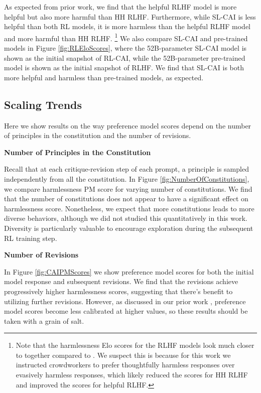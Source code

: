As expected from prior work, we find that the helpful RLHF model is more helpful but also more harmful than HH RLHF.  Furthermore, while SL-CAI is less helpful than both RL models, it is more harmless than the helpful RLHF model and more harmful than HH RLHF. \footnote{Note that the harmlessness Elo scores for the RLHF models look much closer to together compared to \cite{bai2022training}. We suspect this is because for this work we instructed crowdworkers to prefer thoughtfully harmless responses over evasively harmless responses, which likely reduced the scores for HH RLHF and improved the scores for helpful RLHF.} We also compare SL-CAI and pre-trained models in Figure \ref{fig:RLEloScores}, where the 52B-parameter SL-CAI model is shown as the initial snapshot of RL-CAI, while the 52B-parameter pre-trained model is shown as the initial snapshot of RLHF. We find that SL-CAI is both more helpful and harmless than pre-trained models, as expected.

\subsection{Scaling Trends}

Here we show results on the way preference model scores depend on the number of principles in the constitution and the number of revisions.

{\bf Number of Principles in the Constitution}

Recall that at each critique-revision step of each prompt, a  principle is sampled independently from all  the constitution.  In Figure \ref{fig:NumberOfConstitutions}, we compare harmlessness PM score for varying number of constitutions. We find that the number of constitutions does not appear to have a significant effect on harmlessness score. Nonetheless, we expect that more constitutions leads to more diverse behaviors, although we did not studied this quantitatively in this work.  Diversity is particularly valuable to encourage exploration during the subsequent RL training step.

{\bf Number of Revisions}

In Figure \ref{fig:CAIPMScores} we show preference model scores for both the initial model response and subsequent revisions. We find that the revisions achieve progressively higher harmlessness scores, suggesting that there's benefit to utilizing further revisions. However, as discussed in our prior work \cite{bai2022training}, preference model scores become less calibrated at higher values, so these results should be taken with a grain of salt.

